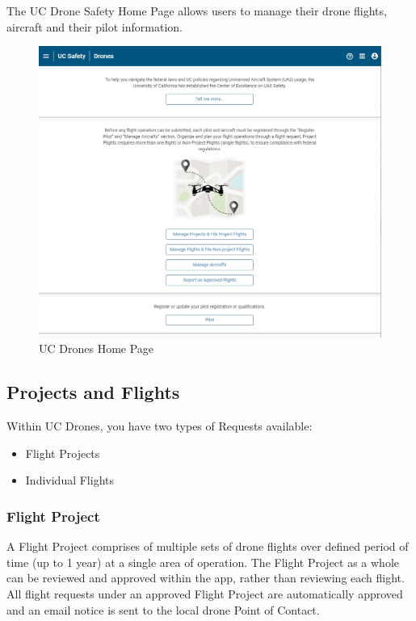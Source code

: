 \documentclass[
  12pt,
]{book}
\providecommand{\tightlist}{%
  \setlength{\itemsep}{0pt}\setlength{\parskip}{0pt}}
\begin{document}
The UC Drone Safety Home Page allows users to manage their drone flights, aircraft and their pilot information.

\begin{figure}

{\centering \includegraphics[width=0.85\linewidth]{images/UCDrones_Home} 

}

\caption{UC Drones Home Page}\label{fig:UCDrones-home}
\end{figure}

\hypertarget{projects-and-flights}{%
\subsection{Projects and Flights}\label{projects-and-flights}}

Within UC Drones, you have two types of Requests available:

\begin{itemize}
\tightlist
\item
  Flight Projects
\item
  Individual Flights
\end{itemize}

\hypertarget{flight-project}{%
\subsubsection{Flight Project}\label{flight-project}}

A Flight Project comprises of multiple sets of drone flights over defined period of time (up to 1 year) at a single area of operation. The Flight Project as a whole can be reviewed and approved within the app, rather than reviewing each flight. All flight requests under an approved Flight Project are automatically approved and an email notice is sent to the local drone Point of Contact.
\end{document}
